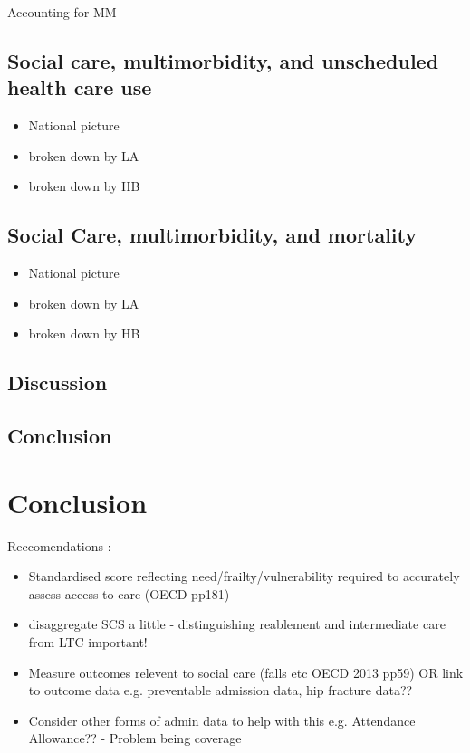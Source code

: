 \documentclass[12pt,]{report}
\begin{document}
Accounting for MM

\section{Social care, multimorbidity, and unscheduled health care use}

\begin{itemize}[noitemsep]
\item National picture
\item broken down by LA
\item broken down by HB
\end{itemize}

\section{Social Care, multimorbidity, and mortality}

\begin{itemize}[noitemsep]
\item National picture
\item broken down by LA
\item broken down by HB
\end{itemize}

\section{Discussion}\label{sec:social-care-discuss}

\section{Conclusion}\label{sec:social-care-conclu}

\FloatBarrier

\FloatBarrier
\newpage
{}

\chapter{Conclusion}\label{ch:conclusion}

Reccomendations :-

\begin{itemize}
\item Standardised score reflecting need/frailty/vulnerability required to accurately assess access to care (OECD pp181)
\item disaggregate SCS a little - distinguishing reablement and intermediate care from LTC important!
\item Measure outcomes relevent to social care (falls etc OECD 2013 pp59) OR link to outcome data e.g. preventable admission data, hip fracture data??
\item Consider other forms of admin data to help with this e.g. Attendance Allowance?? - Problem being coverage
\end{itemize}
\end{document}
